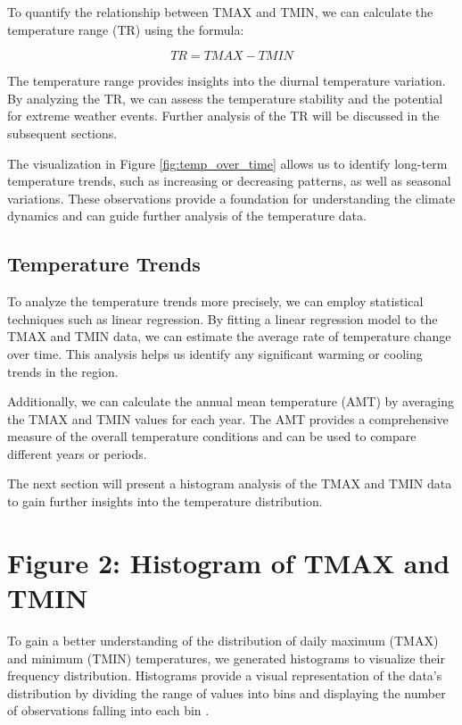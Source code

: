 \documentclass{article}
\begin{document}
To quantify the relationship between TMAX and TMIN, we can calculate the temperature range (TR) using the formula:

\begin{equation}
  TR = TMAX - TMIN
\end{equation}

The temperature range provides insights into the diurnal temperature variation. By analyzing the TR, we can assess the temperature stability and the potential for extreme weather events. Further analysis of the TR will be discussed in the subsequent sections.

The visualization in Figure \ref{fig:temp_over_time} allows us to identify long-term temperature trends, such as increasing or decreasing patterns, as well as seasonal variations. These observations provide a foundation for understanding the climate dynamics and can guide further analysis of the temperature data.

\subsection{Temperature Trends}

To analyze the temperature trends more precisely, we can employ statistical techniques such as linear regression. By fitting a linear regression model to the TMAX and TMIN data, we can estimate the average rate of temperature change over time. This analysis helps us identify any significant warming or cooling trends in the region.

Additionally, we can calculate the annual mean temperature (AMT) by averaging the TMAX and TMIN values for each year. The AMT provides a comprehensive measure of the overall temperature conditions and can be used to compare different years or periods.

The next section will present a histogram analysis of the TMAX and TMIN data to gain further insights into the temperature distribution.
\section{Figure 2: Histogram of TMAX and TMIN}

To gain a better understanding of the distribution of daily maximum (TMAX) and minimum (TMIN) temperatures, we generated histograms to visualize their frequency distribution. Histograms provide a visual representation of the data's distribution by dividing the range of values into bins and displaying the number of observations falling into each bin \cite{scott2015multivariate}.
\end{document}

